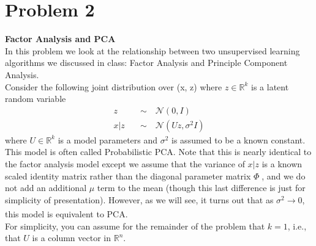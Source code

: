 \documentclass{article}
\begin{document}
\section*{Problem 2}
\textbf{Factor Analysis and PCA}\\
In this problem we look at the relationship between two unsupervised learning algorithms we discussed in class: Factor Analysis and Principle Component Analysis.\\
Consider the following joint distribution over (x, z) where $z\in \mathbb{R}^k$ is a latent random variable\begin{align*}
    z\quad &\sim \quad \mathscr{N}(0,I)\\
    x|z\quad &\sim \quad \mathscr{N}(Uz,\sigma^2I)
\end{align*}
where $U\in \mathbb{R}^k$ is a model parameters and $\sigma^2$ is assumed to be a known constant. This model is often called Probabilistic PCA. Note that this is nearly identical to the factor analysis model except we assume that the variance of $x|z$ is a known scaled identity matrix rather than the diagonal parameter matrix $\Phi$, and we do not add an additional $\mu$ term to
the mean (though this last difference is just for simplicity of presentation). However, as we will see, it turns out that as $\sigma^2 \xrightarrow[]{}0$, this model is equivalent to PCA.\\
For simplicity, you can assume for the remainder of the problem that $k = 1$, i.e., that $U$ is a column vector in $\mathbb{R}^n$.
\end{document}
